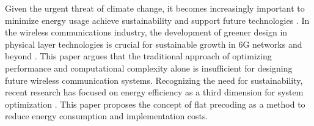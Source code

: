 Given the urgent threat of climate change, it becomes increasingly important to minimize energy usage achieve sustainability and support future technologies \cite{Stefan_2023_Mag}. In the wireless communications industry, the development of greener design in physical layer technologies is crucial for sustainable growth in 6G networks and beyond \cite{Han2021Green}. This paper argues that the traditional approach of optimizing performance and computational complexity alone is insufficient for designing future wireless communication systems. Recognizing the need for sustainability, recent research has focused on energy efficiency as a third dimension for system optimization \cite{Lopez_2022_CST,Lozano_2023_EE}. This paper proposes the  concept of flat precoding as a method to reduce energy consumption and implementation costs.


